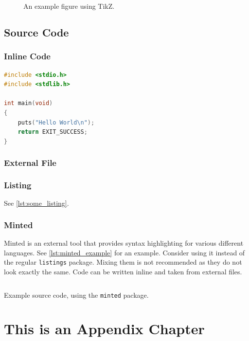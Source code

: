 \documentclass[parskip=half]{scrbook}
\begin{document}
\begin{figure}
	\centering
	
	\caption{An example figure using TikZ.}
	\label{fig:tikz_figure}
\end{figure}

\section{Source Code}

\subsection{Inline Code}

\begin{lstlisting}[language=c]
#include <stdio.h>
#include <stdlib.h>

int main(void)
{
	puts("Hello World\n");
	return EXIT_SUCCESS;
}
\end{lstlisting}

\subsection{External File}



\subsection{Listing}

See \cref{lst:some_listing}.



\subsection{Minted}

Minted is an external tool that provides syntax highlighting for various different languages.
See \cref{lst:minted_example} for an example.
Consider using it instead of the regular \texttt{listings} package.
Mixing them is not recommended as they do not look exactly the same.
Code can be written inline and taken from external files.

\begin{listing}
	\inputminted{haskell}{code/sample.hs}
	\caption{Example source code, using the \texttt{minted} package.}
	\label{lst:minted_example}
\end{listing}

\backmatter

\appendix

\chapter{This is an Appendix Chapter}

\lipsum[1]

\printglossaries

\end{document}
